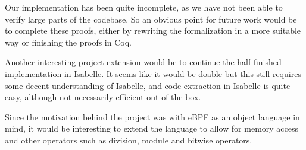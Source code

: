 Our implementation has been quite incomplete, as we have not been able to verify
large parts of the codebase. So an obvious point for future work would be to complete these proofs,
either by rewriting the formalization in a more suitable way or finishing the proofs in Coq.

Another interesting project extension would be to continue the half finished implementation in Isabelle.
It seems like it would be doable but this still requires some decent understanding of Isabelle,
and code extraction in Isabelle is quite easy, although not necessarily efficient out of the box.

Since the motivation behind the project was with eBPF as an object language in mind, it would be interesting to
extend the language to allow for memory access and other operators such as division, module and bitwise operators.